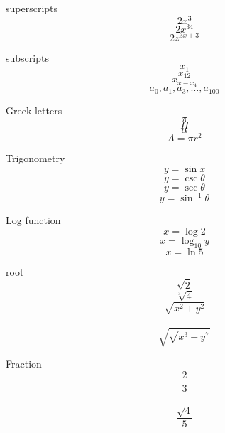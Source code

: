 \documentclass[12pt]{article}
\begin{document}
superscripts $$2x^3$$
$$2x^{34}$$
$$2z^{3x+3}$$

subscripts
$$x_1$$
$$x_{12}$$
$$x_{x-{x_4}}$$
$$a_0,a_1,a_3,\ldots,a_{100}$$


Greek letters
$$\pi$$
$$\Pi$$
$$\alpha$$
$$A=\pi r^2$$

Trigonometry
$$y=\sin x$$
$$y=\csc \theta$$
$$ y=\sec \theta $$
$$y=\sin^{-1}\theta$$

Log function
$$x=\log 2$$
$$x=\log _{10} y$$
$$ x= \ln 5 $$

root
$$\sqrt{2}$$
$$\sqrt[3]{4}$$
$$\sqrt{x^2+y^2}$$\\[16pt]
$$\sqrt{\sqrt{x^3+y^7}}$$

Fraction
$$\frac{2}{3}$$\\[6pt]
$$\frac{\sqrt{4}}{5}$$
\end{document}
